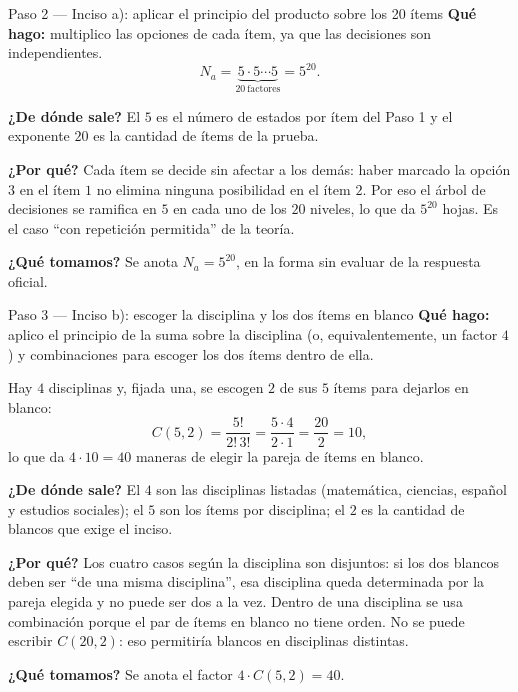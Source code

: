 \documentclass[11pt]{article}
\begin{document}
\begin{paso}{Paso 2 --- Inciso a): aplicar el principio del producto sobre los 20 ítems}
\textbf{Qué hago:} multiplico las opciones de cada ítem, ya que las decisiones son independientes.
\[
  N_a = \underbrace{5\cdot 5\cdots 5}_{20\ \text{factores}} = 5^{20} .
\]

\textbf{¿De dónde sale?} El $5$ es el número de estados por ítem del Paso 1 y el exponente $20$ es la cantidad de ítems de la prueba.

\textbf{¿Por qué?} Cada ítem se decide sin afectar a los demás: haber marcado la opción $3$ en el ítem $1$ no elimina ninguna posibilidad en el ítem $2$. Por eso el árbol de decisiones se ramifica en $5$ en cada uno de los $20$ niveles, lo que da $5^{20}$ hojas. Es el caso ``con repetición permitida'' de la teoría.

\textbf{¿Qué tomamos?} Se anota $N_a=5^{20}$, en la forma sin evaluar de la respuesta oficial.
\end{paso}

\begin{paso}{Paso 3 --- Inciso b): escoger la disciplina y los dos ítems en blanco}
\textbf{Qué hago:} aplico el principio de la suma sobre la disciplina (o, equivalentemente, un factor $4$) y combinaciones para escoger los dos ítems dentro de ella.

Hay $4$ disciplinas y, fijada una, se escogen $2$ de sus $5$ ítems para dejarlos en blanco:
\[
  C(5,2)=\frac{5!}{2!\,3!}=\frac{5\cdot 4}{2\cdot 1}=\frac{20}{2}=10 ,
\]
lo que da $4\cdot 10 = 40$ maneras de elegir la pareja de ítems en blanco.

\textbf{¿De dónde sale?} El $4$ son las disciplinas listadas (matemática, ciencias, español y estudios sociales); el $5$ son los ítems por disciplina; el $2$ es la cantidad de blancos que exige el inciso.

\textbf{¿Por qué?} Los cuatro casos según la disciplina son disjuntos: si los dos blancos deben ser ``de una misma disciplina'', esa disciplina queda determinada por la pareja elegida y no puede ser dos a la vez. Dentro de una disciplina se usa combinación porque el par de ítems en blanco no tiene orden. No se puede escribir $C(20,2)$: eso permitiría blancos en disciplinas distintas.

\textbf{¿Qué tomamos?} Se anota el factor $4\cdot C(5,2)=40$.
\end{paso}
\end{document}
